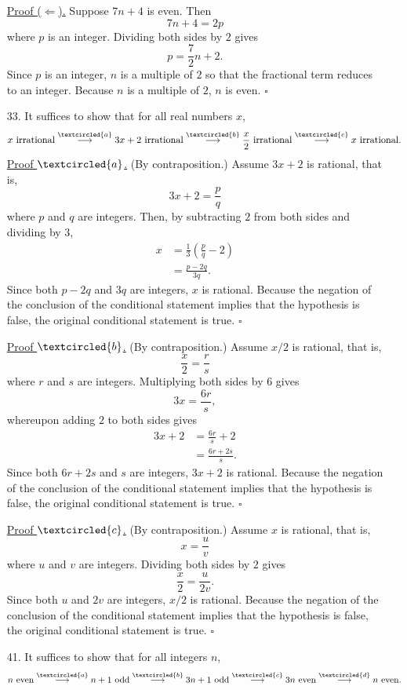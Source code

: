 \documentclass{article}
\begin{document}
\begin{enumerate}
    \underline{Proof ($\Leftarrow$).} Suppose $7n+4$ is even. Then
    \[
    7n+4 = 2p
    \]
    where $p$ is an integer. Dividing both sides by $2$ gives
    \[
    p = \frac{7}{2}n + 2.
    \]
    Since $p$ is an integer, $n$ is a multiple of $2$ so that the fractional term reduces to an integer. Because $n$ is a multiple of $2$, $n$ is even. $\square$
    \item[33.] It suffices to show that for all real numbers $x$,
    \[
    x \textrm{ irrational} \overset{\textcircled{a}}{\longrightarrow} 3x+2 \textrm{ irrational} \overset{\textcircled{b}}{\longrightarrow} \frac{x}{2} \textrm{ irrational} \overset{\textcircled{c}}{\longrightarrow} x \textrm{ irrational}.
    \]
    \underline{Proof $\textcircled{a}$.} (By contraposition.) Assume $3x+2$ is rational, that is,
    \[
    3x+2 = \frac{p}{q}
    \]
    where $p$ and $q$ are integers. Then, by subtracting $2$ from both sides and dividing by $3$,
    \begin{align*}
    x &= \frac{1}{3}\left( \frac{p}{q}-2 \right) \\
    &= \frac{p-2q}{3q}.
    \end{align*}
    Since both $p-2q$ and $3q$ are integers, $x$ is rational. Because the negation of the conclusion of the conditional statement implies that the hypothesis is false, the original conditional statement is true. $\square$

    \underline{Proof $\textcircled{b}$.} (By contraposition.) Assume $x/2$ is rational, that is,
    \[
    \frac{x}{2} = \frac{r}{s}
    \]
    where $r$ and $s$ are integers. Multiplying both sides by $6$ gives
    \[
    3x = \frac{6r}{s},
    \]
    whereupon adding $2$ to both sides gives
    \begin{align*}
    3x + 2 &= \frac{6r}{s} + 2\\
    &= \frac{6r+2s}{s}.
    \end{align*}
    Since both $6r+2s$ and $s$ are integers, $3x+2$ is rational. Because the negation of the conclusion of the conditional statement implies that the hypothesis is false, the original conditional statement is true. $\square$

    \underline{Proof $\textcircled{c}$.} (By contraposition.) Assume $x$ is rational, that is,
    \[
    x = \frac{u}{v}
    \]
    where $u$ and $v$ are integers. Dividing both sides by $2$ gives
    \[
    \frac{x}{2} = \frac{u}{2v}.
    \]
    Since both $u$ and $2v$ are integers, $x/2$ is rational. Because the negation of the conclusion of the conditional statement implies that the hypothesis is false, the original conditional statement is true. $\square$
    \item[41.] It suffices to show that for all integers $n$,
    \[
    n \textrm{ even} \overset{\textcircled{a}}{\longrightarrow} n+1 \textrm{ odd} \overset{\textcircled{b}}{\longrightarrow} 3n+1 \textrm{ odd} \overset{\textcircled{c}}{\longrightarrow} 3n \textrm{ even} \overset{\textcircled{d}}{\longrightarrow} n \textrm{ even}.
    \]


\end{enumerate}
\end{document}
